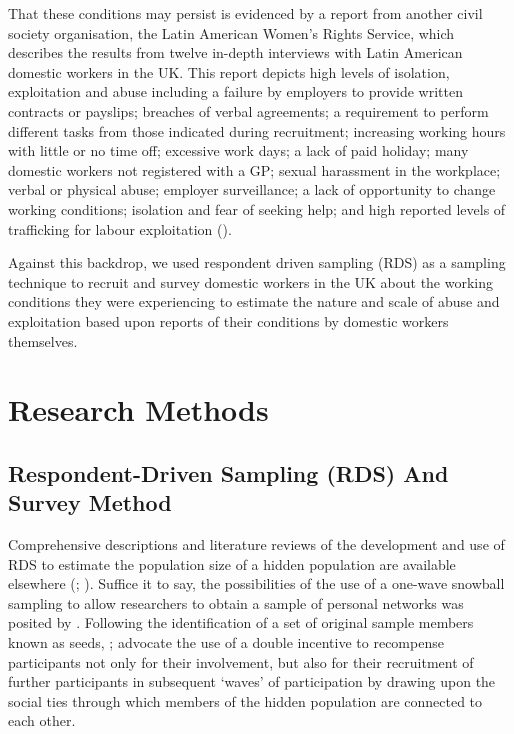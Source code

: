 \documentclass[
  12pt,
  letterpaper,
  DIV=11,
  numbers=noendperiod]{scrartcl}
\theoremstyle{plain}
\theoremstyle{definition}
\begin{document}
That these conditions may persist is evidenced by a report from another
civil society organisation, the Latin American Women's Rights Service,
which describes the results from twelve in-depth interviews with Latin
American domestic workers in the UK. This report depicts high levels of
isolation, exploitation and abuse including a failure by employers to
provide written contracts or payslips; breaches of verbal agreements; a
requirement to perform different tasks from those indicated during
recruitment; increasing working hours with little or no time off;
excessive work days; a lack of paid holiday; many domestic workers not
registered with a GP; sexual harassment in the workplace; verbal or
physical abuse; employer surveillance; a lack of opportunity to change
working conditions; isolation and fear of seeking help; and high
reported levels of trafficking for labour exploitation
(\textcite{latin_american_womens_rights_service_behind_2023}).

Against this backdrop, we used respondent driven sampling (RDS) as a
sampling technique to recruit and survey domestic workers in the UK
about the working conditions they were experiencing to estimate the
nature and scale of abuse and exploitation based upon reports of their
conditions by domestic workers themselves.

\section{Research Methods}\label{research-methods}

\subsection{Respondent-Driven Sampling (RDS) And Survey
Method}\label{respondent-driven-sampling-rds-and-survey-method}

Comprehensive descriptions and literature reviews of the development and
use of RDS to estimate the population size of a hidden population are
available elsewhere (\textcite{heckathorn_comment_2011};
\textcite{gile_methods_2018}). Suffice it to say, the possibilities of
the use of a one-wave snowball sampling to allow researchers to obtain a
sample of personal networks was posited by
\textcite{frank_estimating_1994}. Following the identification of a set
of original sample members known as seeds,
\textcite{heckathorn_respondent-driven_1997};
\textcite{heckathorn_respondent-driven_2002} advocate the use of a
double incentive to recompense participants not only for their
involvement, but also for their recruitment of further participants in
subsequent `waves' of participation by drawing upon the social ties
through which members of the hidden population are connected to each
other.
\end{document}
